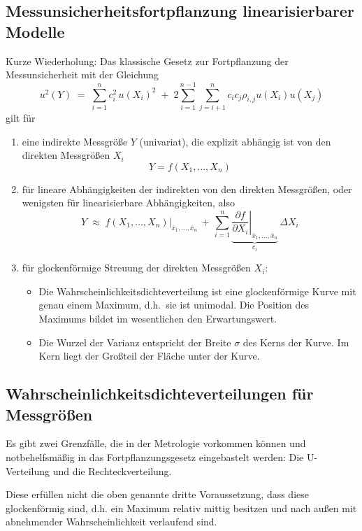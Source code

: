 \subsection{Messunsicherheitsfortpflanzung linearisierbarer Modelle}
Kurze Wiederholung: 
Das klassische Gesetz zur Fortpflanzung der Messunsicherheit mit der Gleichung
\begin{equation}
u^2(Y) \; = \; \sum\limits_{i=1}^n c_i^2 \, u(X_i)^2 \; + \;
2 \sum\limits_{i = 1}^{n-1} \sum\limits_{j = i+1}^n c_i c_j \rho_{i, j} u(X_i) u(X_j)
\end{equation}
gilt für
\begin{enumerate}
	\item eine indirekte Messgröße $Y$ (univariat), die explizit abhängig ist von den direkten Messgrößen $X_i$
	\begin{equation}
	Y = f(X_1, \dots, X_n)
	\end{equation}
	\item für lineare Abhängigkeiten der indirekten von den direkten Messgrößen, oder wenigsten
	für linearisierbare Abhängigkeiten, also
	\begin{equation}
	Y \; \approx \; \left. f(X_1, \dots, X_n) \right|_{\bar x_1,\dots, \bar x_n} \, + \,
	\sum\limits_{i=1}^n \underbrace{\left. \frac{\partial f}{\partial X_i} \right|_{\bar x_1,\dots, \bar x_n}}_{c_i} \,
	\Delta X_i
	\end{equation}
	\item für glockenförmige Streuung der direkten Messgrößen $X_i$: 
	\begin{itemize}
		\item Die Wahrscheinlichkeitsdichteverteilung
		ist eine glockenförmige Kurve mit genau einem Maximum, d.h.\ sie ist unimodal.
		Die Position des Maximums bildet im wesentlichen den Erwartungswert.
		\item Die Wurzel der Varianz entspricht der Breite $\sigma$ des Kerns der Kurve. Im Kern liegt
		der Großteil der Fläche unter der Kurve.
	\end{itemize}
\end{enumerate}
\subsection{Wahrscheinlichkeitsdichteverteilungen für Messgrößen}
Es gibt zwei Grenzfälle, die in der Metrologie vorkommen können und notbehelfsmäßig
in das Fort\-pflanzungs\-gesetz eingebastelt werden: Die U-Verteilung und die Rechteckverteilung.

Diese erfüllen nicht die oben genannte dritte Voraussetzung, 
dass diese glockenförmig sind, d.h. ein Maximum relativ mittig besitzen und nach außen mit abnehmender Wahrscheinlichkeit verlaufend sind.

